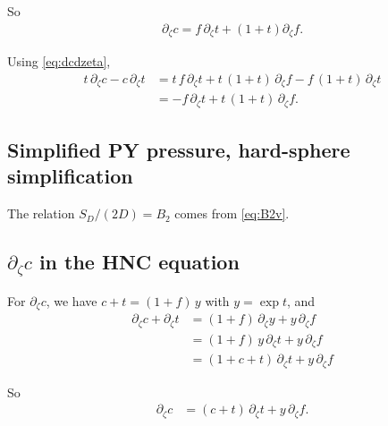 \documentclass[preprint]{revtex4-1}
\numberwithin{equation}{subsection}
\numberwithin{table}{section}
\begin{document}
So
\begin{align}
\partial_\zeta c
=
f \, \partial_\zeta t
+ (1+t) \partial_\zeta f.
\label{eq:dcdzeta}
\end{align}

Using \eqref{eq:dcdzeta},
\begin{align*}
  t\, \partial_\zeta c - c \, \partial_\zeta t
&=
  t \, f \, \partial_\zeta t
+ t \, (1 + t) \, \partial_\zeta f
- f \, (1 + t) \, \partial_\zeta t
\\
&=
- f \, \partial_\zeta t
+ t \, (1 + t) \, \partial_\zeta f.
\end{align*}


\subsection{Simplified PY pressure, hard-sphere simplification}

The relation $S_D/(2D) = B_2$ comes from \eqref{eq:B2v}.


\subsection{$\partial_\zeta c$ in the HNC equation}

For $\partial_\zeta c$, we have
$c + t = (1 + f) \, y$
with
$y = \exp t$,
and
\begin{align*}
  \partial_\zeta c + \partial_\zeta t
&= (1 + f) \, \partial_\zeta y
+ y \, \partial_\zeta f
\\
&= (1 + f) \, y \, \partial_\zeta t
+ y \, \partial_\zeta f
\\
&= (1 + c + t) \, \partial_\zeta t
+ y \, \partial_\zeta f
\end{align*}

So
\begin{align*}
  \partial_\zeta c
&= (c + t) \, \partial_\zeta t
+ y \, \partial_\zeta f.
\end{align*}



\end{document}
